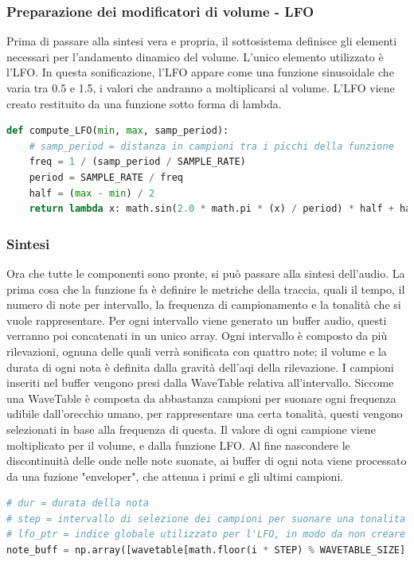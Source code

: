 \subsubsection{Preparazione dei modificatori di volume - LFO}
Prima di passare alla sintesi vera e propria, il sottosistema definisce gli elementi necessari per l'andamento dinamico del volume.
L'unico elemento utilizzato è l'LFO.
In questa sonificazione, l'LFO appare come una funzione sinusoidale che varia tra 0.5 e 1.5, i valori che andranno a moltiplicarsi al volume.
L'LFO viene creato restituito da una funzione sotto forma di lambda.
\begin{lstlisting}[language=Python]
def compute_LFO(min, max, samp_period): 
    # samp_period = distanza in campioni tra i picchi della funzione
    freq = 1 / (samp_period / SAMPLE_RATE)
    period = SAMPLE_RATE / freq
    half = (max - min) / 2
    return lambda x: math.sin(2.0 * math.pi * (x) / period) * half + half + min
\end{lstlisting}

\subsubsection{Sintesi}
Ora che tutte le componenti sono pronte, si può passare alla sintesi dell'audio.
La prima cosa che la funzione fa è definire le metriche della traccia, quali il tempo, il numero di note per intervallo, la frequenza di campionamento e la tonalità che si vuole rappresentare.
Per ogni intervallo viene generato un buffer audio, questi verranno poi concatenati in un unico array.
Ogni intervallo è composto da più rilevazioni, ognuna delle quali verrà sonificata con quattro note; il volume e la durata di ogni nota è definita dalla gravità dell'aqi della rilevazione.
I campioni inseriti nel buffer vengono presi dalla WaveTable relativa all'intervallo.
Siccome una WaveTable è composta da abbastanza campioni per suonare ogni frequenza udibile dall'orecchio umano, per rappresentare una certa tonalità, questi vengono selezionati in base alla frequenza di questa.
Il valore di ogni campione viene moltiplicato per il volume, e dalla funzione LFO.
Al fine nascondere le discontinuità delle onde nelle note suonate, ai buffer di ogni nota viene processato da una fuzione "enveloper", che attenua i primi e gli ultimi campioni.

\begin{lstlisting}[language=Python]
# dur = durata della nota
# step = intervallo di selezione dei campioni per suonare una tonalita
# lfo_ptr = indice globale utilizzato per l'LFO, in modo da non creare oscillazioni di volume discontinue
note_buff = np.array([wavetable[math.floor(i * STEP) % WAVETABLE_SIZE] * vol * LFO(i + lfo_ptr) for i in range(dur)])
\end{lstlisting}



